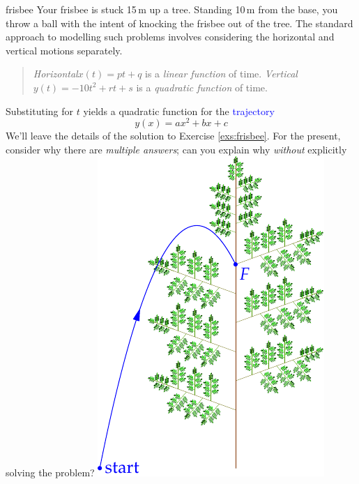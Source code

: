 \begin{example}[lower separated=false, sidebyside, sidebyside align=top seam, sidebyside gap=0pt, righthand width=0.3\linewidth]{}{frisbee}
	Your frisbee is stuck 15\,m up a tree. Standing 10\,m from the base, you throw a ball with the intent of knocking the frisbee out of the tree.\smallbreak
	The standard approach to modelling such problems involves considering the horizontal and vertical motions separately.
	\begin{quote}
		\emph{Horizontal}\lstsp $x(t)=pt+q$ is a \emph{linear function} of time.\smallbreak
		\emph{Vertical}\lstsp $y(t)=-10t^2+rt+s$ is a \emph{quadratic function} of time.
	\end{quote}
	Substituting for $t$ yields a quadratic function for the \textcolor{blue}{trajectory}
	\[
		y(x)=ax^2+bx+c
	\]
	We'll leave the details of the solution to Exercise \ref{exs:frisbee}. For the present, consider why there are \emph{multiple answers}; can you explain why \emph{without} explicitly solving the problem?
	\tcblower
	\flushright\includegraphics[scale=0.88]{tree1}
\end{example}



